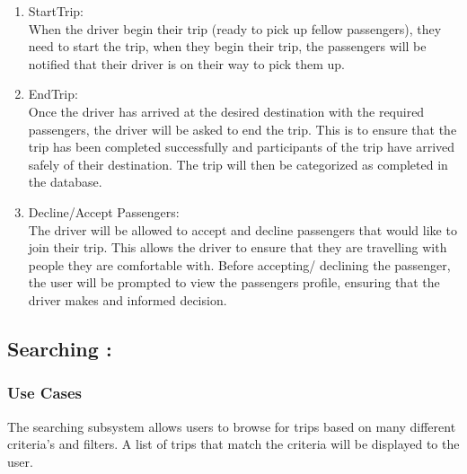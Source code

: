 \documentclass[hidelinks, 12pt, a4paper]{article}
\begin{document}
\begin{enumerate}[label=U1.\arabic*]
      \item StartTrip: \\
            When the driver begin their trip (ready to pick up fellow passengers), they need to start the trip, when they begin their trip, the passengers will be notified that their driver is on their way to pick them up.\\

      \item EndTrip:\\
            Once the driver has arrived at the desired destination with the required passengers, the driver will be asked to end the trip. This is to ensure that the trip has been completed successfully and participants of the trip have arrived safely of their destination. The trip will then be categorized  as completed in the database.\\

      \item Decline/Accept Passengers:\\
            The driver will be allowed to accept and decline passengers that would like to join their trip. This allows the driver to ensure that they are travelling with people they are comfortable with. Before accepting/ declining the passenger, the user will be prompted to view the passengers profile, ensuring that the driver makes and informed decision.\\

\end{enumerate}

\newpage
\subsection{Searching :}
\subsubsection{Use Cases}
The searching subsystem allows users to browse for trips based on many different criteria’s and filters. A list of trips that match the criteria will be displayed to the user.
\end{document}
